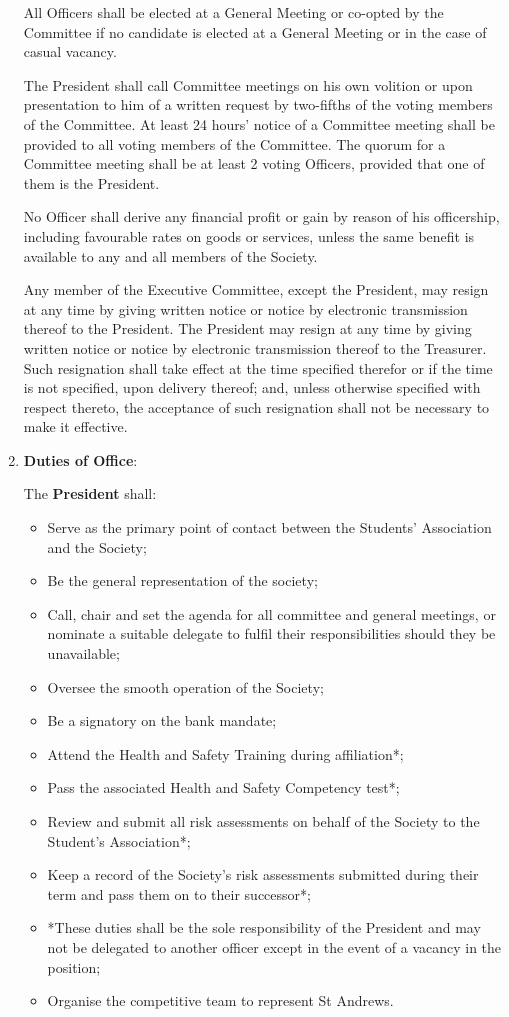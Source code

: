 \documentclass[11pt]{article}
\begin{document}
\begin{enumerate}[label = \Roman*.]
All Officers shall be elected at a General Meeting or co-opted by the Committee if no candidate is elected at a General Meeting or in the case of casual vacancy.

The President shall call Committee meetings on his own volition or upon presentation to him of a written request by two-fifths of the voting members of the Committee.  At least 24 hours' notice of a Committee meeting shall be provided to all voting members of the Committee.  The quorum for a Committee meeting shall be at least 2 voting Officers, provided that one of them is the President. 

No Officer shall derive any financial profit or gain by reason of his officership, including favourable rates on goods or services, unless the same benefit is available to any and all members of the Society.

Any member of the Executive Committee, except the President, may resign at any time by giving written notice or notice by electronic transmission thereof to the President. The President may resign at any time by giving written notice or notice by electronic transmission thereof to the Treasurer. Such resignation shall take effect at the time specified therefor or if the time is not specified, upon delivery thereof; and, unless otherwise specified with respect  thereto, the  acceptance of such resignation shall not be necessary to make it effective.

\item \textbf{Duties of Office}:

The \textbf{President} shall:
\begin{itemize}
\item Serve as the primary point of contact between the Students' Association and the Society;
\item Be the general representation of the society;
\item Call, chair and set the agenda for all committee and general meetings, or nominate a suitable delegate to fulfil their responsibilities should they be unavailable;
\item Oversee the smooth operation of the Society;
\item Be a signatory on the bank mandate;
\item Attend the Health and Safety Training during affiliation*;
\item Pass the associated Health and Safety Competency test*;
\item Review and submit all risk assessments on behalf of the Society to the Student's Association*;
\item Keep a record of the Society's risk assessments submitted during their term and pass them on to their successor*;
\item *These duties shall be the sole responsibility of the President and may not be delegated to another officer except in the event of a vacancy in the position;
\item Organise the competitive team to represent St Andrews.
\end{itemize}


\end{enumerate}
\end{document}
